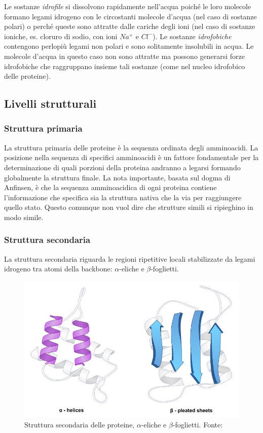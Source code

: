 {{\begin{itemize}
	Le sostanze \textit{idrofile} si dissolvono rapidamente nell'acqua poiché le loro molecole formano legami idrogeno con le circostanti molecole d'acqua (nel caso di sostanze polari) o perché queste sono attratte dalle cariche degli ioni (nel caso di sostanze ioniche, es. cloruro di sodio, con ioni $Na^{+}$ e $Cl^{-}$). Le sostanze \textit{idrofobiche} contengono perlopiù legami non polari e sono solitamente insolubili in acqua. Le molecole d'acqua in questo caso non sono attratte ma possono generarsi forze idrofobiche che raggruppano insieme tali sostanze (come nel nucleo idrofobico delle proteine).
\end{itemize}
}

\subsection{Livelli strutturali}
\subsubsection{Struttura primaria}
La struttura primaria delle proteine è la sequenza ordinata degli amminoacidi. La posizione nella sequenza di specifici amminoacidi è un fattore fondamentale per la determinazione di quali porzioni della proteina andranno a legarsi formando globalmente la struttura finale. La nota importante, basata sul dogma di Anfinsen, è che la sequenza amminoacidica di ogni proteina contiene l'informazione che specifica sia la struttura nativa che la via per raggiungere quello stato. Questo comunque non vuol dire che strutture simili si ripieghino in modo simile.
	
\subsubsection{Struttura secondaria}
{
La struttura secondaria riguarda le regioni ripetitive locali stabilizzate da legami idrogeno tra atomi della backbone: $\alpha$-eliche e $\beta$-foglietti.

\begin{figure}[h]
	\centering
	\includegraphics[scale=0.4]{images/secondary.jpeg}
	\caption{Struttura secondaria delle proteine, $\alpha$-eliche e $\beta$-foglietti. Fonte: \cite{proteinStrucBioNinja}}
	\label{fig:struttura-secondaria}
\end{figure}

}}
